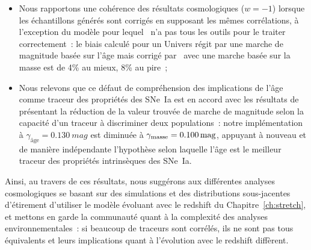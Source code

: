 \documentclass[../main/main.tex]{subfiles}
\begin{document}
\begin{itemize}
{        scolnic2018, popovic2021a}, attestant de la force de l'hypothèse
        initiale ainsi que celle du modèle prospectif établi en début de thèse~;
        celui-ci ne faillit qu'au niveau de la reproduction du seul sondage
        ciblé de l'étude (LOWZ) qui est par construction non-représentatif de la
        nature~;
    \item Nous rapportons une cohérence des résultats cosmologiques ($w=-1$)
        lorsque les échantillons générés sont corrigés en supposant les mêmes
        corrélations, à l'exception du modèle pour lequel \snana\ n'a pas tous
        les outils pour le traiter correctement~: le biais calculé pour un
        Univers régit par une marche de magnitude basée sur l'âge mais corrigé
        par \snana\ avec une marche basée sur la masse est de 4\% au mieux, 8\%
        au pire~;
    \item Nous relevons que ce défaut de compréhension des implications de l'âge
        comme traceur des propriétés des SNe~Ia est en accord avec les résultats
        de~\cite{briday2021, briday2022} présentant la réduction de la valeur
        trouvée de marche de magnitude selon la capacité d'un traceur à
        discriminer deux populations~: notre implémentation à $\gamma_\text{âge}
        = \SI{0.130}{mag}$ est diminuée à $\gamma_{\rm masse} =
        \SI{0.100}{mag}$, appuyant à nouveau et de manière indépendante
        l'hypothèse selon laquelle l'âge est le meilleur traceur des propriétés
        intrinsèques des SNe~Ia.
\end{itemize}

Ainsi, au travers de ces résultats, nous suggérons aux différentes analyses
cosmologiques se basant sur des simulations et des distributions sous-jacentes
d'étirement d'utiliser le modèle évoluant avec le redshift du
Chapitre~\ref{ch:stretch}, et mettons en garde la communauté quant à la
complexité des analyses environnementales~: si beaucoup de traceurs sont
corrélés, ils ne sont pas tous équivalents et leurs implications quant à
l'évolution avec le redshift diffèrent. 

% 
% 
\end{document}
